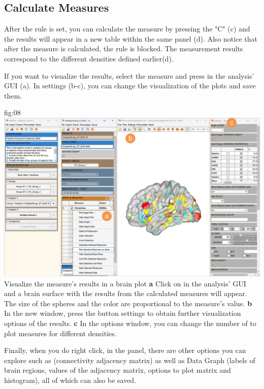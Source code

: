 \documentclass[justified]{tufte-handout}
\begin{document}
\subsection{Calculate Measures}
After the rule is set, you can calculate the measure by pressing the "C" (c) and the results will appear in a new table within the same panel (d). Also notice that after the measure is calculated, the rule is blocked. The measurement results correspond to the different densities defined earlier(d).
 
 If you want to visualize the results, select the measure and press  in the analysis' GUI (a). In settings (b-c), you can change the visualization of the plots and save them. 
 
	{fig:08}
	{
	\includegraphics{fig08.jpg}
	}
	{Visualize the measure's results in a brain plot}
	{
	{\bf a} Click on  in the analysis' GUI and a brain surface with the results from the calculated measures will appear. The size of the spheres and the color are proportional to the measure's value.   
    {\bf b} In the new window, press the button settings to obtain further visualization options of the results. 
    {\bf c} In the options window, you can change the number 
    of  to plot measures for different densities.
	}
 
 Finally, when you do right click, in the  panel, there are other options you can explore such as  (connectivity adjacency matrix) as well as Data Graph (labels of brain regions, values of the adjacency matrix, options to plot matrix and histogram), all of which can also be saved.
  
\end{document}
